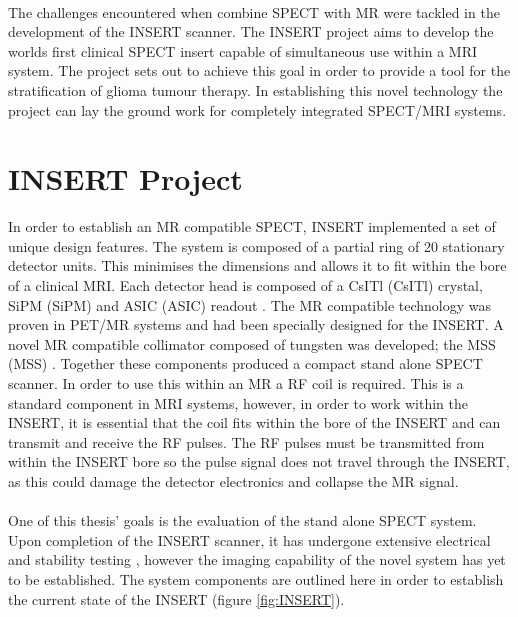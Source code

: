 \paragraph{}
The challenges encountered when combine \acrshort{SPECT} with \acrshort{MR} were tackled in the development of the \acrshort{INSERT} scanner. The \acrshort{INSERT} project aims to develop the worlds first clinical \acrshort{SPECT} insert capable of simultaneous use within a \acrshort{MRI} system. The project sets out to achieve this goal in order to provide a tool for the stratification of glioma tumour therapy. In establishing this novel technology the project can lay the ground work for completely integrated \acrshort{SPECT/MRI} systems.

\section{INSERT Project}
In order to establish an \acrshort{MR} compatible \acrshort{SPECT}, \acrshort{INSERT} implemented a set of unique design features. The system is composed of a partial ring of 20 stationary detector units. This minimises the dimensions and allows it to fit within the bore of a clinical \acrshort{MRI}. Each detector head is composed of a \acrlong{CsITl} (\acrshort{CsITl}) crystal, \acrlong{SiPM} (\acrshort{SiPM}) and \acrlong{ASIC} (\acrshort{ASIC}) readout \cite{Trigilio2018AApplications}. The \acrshort{MR} compatible technology was proven in \acrshort{PET/MR} systems and had been specially designed for the \acrshort{INSERT}. A novel \acrshort{MR} compatible collimator composed of tungsten was developed; the \acrlong{MSS} (\acrshort{MSS}) \cite{7430894}. Together these components produced a compact stand alone \acrshort{SPECT} scanner. In order to use this within an \acrshort{MR} a \acrlong{RF} coil is required. This is a standard component in \acrshort{MRI} systems, however, in order to work within the \acrshort{INSERT}, it is essential that the coil fits within the bore of the \acrshort{INSERT} and can transmit and receive the \acrshort{RF} pulses. The \acrshort{RF} pulses must be transmitted from within the \acrshort{INSERT} bore so the pulse signal does not travel through the \acrshort{INSERT}, as this could damage the detector electronics and collapse the \acrshort{MR} signal.
\paragraph{}
One of this thesis' goals is the evaluation of the stand alone \acrshort{SPECT} system. Upon completion of the \acrshort{INSERT} scanner, it has undergone extensive electrical and stability testing \cite{8432104}, however the imaging capability of the novel system has yet to be established. The system components are outlined here in order to establish the current state of the \acrshort{INSERT} (figure \ref{fig:INSERT}).

